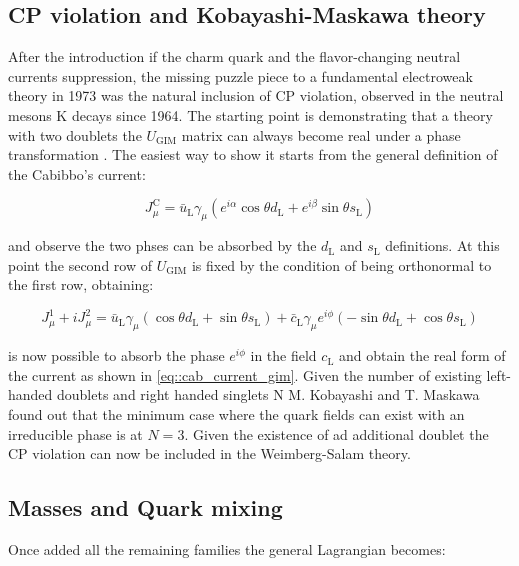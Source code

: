 \subsection{CP violation and Kobayashi-Maskawa theory}

After the introduction if the charm quark and the flavor-changing neutral currents suppression, the missing puzzle piece to a fundamental electroweak theory in 1973 was the natural inclusion of CP violation, observed in the neutral mesons K decays since 1964. 
The starting point is demonstrating that a theory with two doublets the $U_{\text{GIM}}$ matrix can always become real under a phase transformation \cite{Glashow:1970gm}. The easiest way to show it starts from the general definition of the Cabibbo's current:

\begin{equation}
J^{\text{C}}_{\mu} = \bar{u}_{\text{L}}\gamma_{\mu}\left( e^{i\alpha} \cos\theta d_{\text{L}} + e^{i\beta}\sin\theta s_{\text{L}}   \right)
\end{equation}

and observe the two phses can be absorbed by the $d_{\text{L}}$ and $s_{\text{L}}$ definitions. At this point the second row of $U_{\text{GIM}}$ is fixed by the condition of being orthonormal to the first row, obtaining:

\begin{equation}
J^{1}_{\mu} + i J^{2}_{\mu} =  \bar{u}_{\text{L}}\gamma_{\mu} \left(\cos\theta d_{\text{L}} +\sin\theta s_{\text{L}}\right) + \bar{c}_{\text{L}}\gamma_{\mu}e^{i\phi} (-\sin\theta d_{\text{L}} + \cos\theta s_{\text{L}})
\end{equation}

is now possible to absorb the phase $e^{i\phi}$ in the field $c_{\text{L}}$ and obtain the real form of the current as shown in \autoref{eq::cab_current_gim}. Given the number of existing left-handed doublets and right handed singlets N M. Kobayashi and T. Maskawa found out that the minimum case where the quark fields can exist with an irreducible phase is at $N = 3$. Given the existence of ad additional doublet the CP violation can now be included in the Weimberg-Salam theory.

\subsection{Masses and Quark mixing}

Once added all the remaining families the general Lagrangian becomes:

